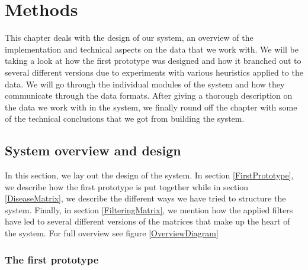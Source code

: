 \chapter{Methods\label{Methods}}

This chapter deals with the design of our system, an overview of the
implementation and technical aspects on the data that we work with. We
will be taking a look at how the first prototype was designed and how
it branched out to several different versions due to experiments with
various heuristics applied to the data. We will go through the
individual modules of the system and how they communicate through the
data formats. After giving a thorough description on the data we work
with in the system, we finally round off the chapter with some of the
technical conclusions that we got from building the system.

\section{System overview and design\label{SystemOverviewAndDesign}}

In this section, we lay out the design of the system. In section
\ref{FirstPrototype}, we describe how the first prototype is put
together while in section \ref{DiseaseMatrix}, we describe the
different ways we have tried to structure the system. Finally, in section
\ref{FilteringMatrix}, we mention how the applied filters have led to
several different versions of the matrices that make up the heart of
the system. For full overview see figure \ref{OverviewDiagram}

\subsection{The first prototype\label{FirstPrototype}}

